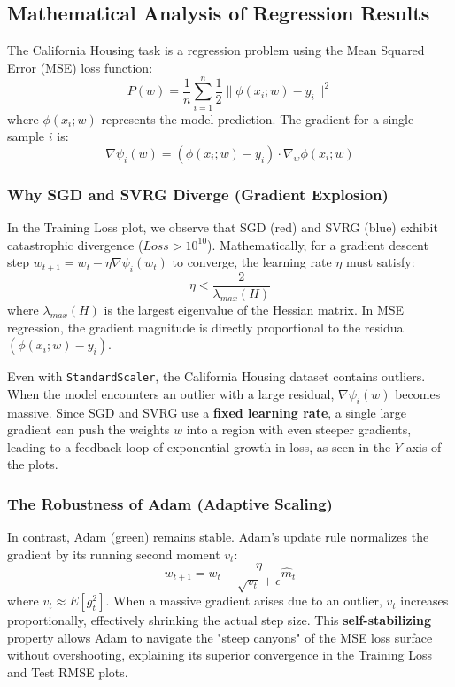 \documentclass[11pt,a4paper]{article}
\begin{document}
\subsection{Mathematical Analysis of Regression Results}

The California Housing task is a regression problem using the Mean Squared Error (MSE) loss function:
\begin{equation}
P(w) = \frac{1}{n} \sum_{i=1}^{n} \frac{1}{2} \| \phi(x_i; w) - y_i \|^2
\end{equation}
where $\phi(x_i; w)$ represents the model prediction. The gradient for a single sample $i$ is:
\begin{equation}
\nabla \psi_i(w) = (\phi(x_i; w) - y_i) \cdot \nabla_w \phi(x_i; w)
\end{equation}

\subsubsection{Why SGD and SVRG Diverge (Gradient Explosion)}
In the Training Loss plot, we observe that SGD (red) and SVRG (blue) exhibit catastrophic divergence ($Loss > 10^{10}$). Mathematically, for a gradient descent step $w_{t+1} = w_t - \eta \nabla \psi_i(w_t)$ to converge, the learning rate $\eta$ must satisfy:
\begin{equation}
\eta < \frac{2}{\lambda_{max}(H)}
\end{equation}
where $\lambda_{max}(H)$ is the largest eigenvalue of the Hessian matrix. In MSE regression, the gradient magnitude is directly proportional to the residual $(\phi(x_i; w) - y_i)$. 

Even with \texttt{StandardScaler}, the California Housing dataset contains outliers. When the model encounters an outlier with a large residual, $\nabla \psi_i(w)$ becomes massive. Since SGD and SVRG use a \textbf{fixed learning rate}, a single large gradient can push the weights $w$ into a region with even steeper gradients, leading to a feedback loop of exponential growth in loss, as seen in the $Y$-axis of the plots.

\subsubsection{The Robustness of Adam (Adaptive Scaling)}
In contrast, Adam (green) remains stable. Adam's update rule normalizes the gradient by its running second moment $v_t$:
\begin{equation}
w_{t+1} = w_t - \frac{\eta}{\sqrt{v_t} + \epsilon} \hat{m}_t
\end{equation}
where $v_t \approx E[g_t^2]$. When a massive gradient arises due to an outlier, $v_t$ increases proportionally, effectively shrinking the actual step size. This \textbf{self-stabilizing} property allows Adam to navigate the "steep canyons" of the MSE loss surface without overshooting, explaining its superior convergence in the Training Loss and Test RMSE plots.
\end{document}

